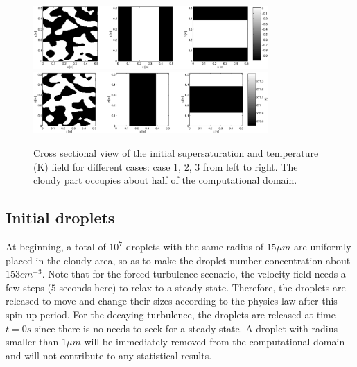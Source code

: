 \documentclass[draft,jgrga]{AGUTeX}
\begin{document}
\begin{article}
\begin{figure}\centering
\includegraphics[width=0.8\textwidth]{Figures/supersat_case123}\\
\includegraphics[width=0.8\textwidth]{Figures/temp_case123}
\caption{Cross sectional view of the initial supersaturation and temperature (K) field for different cases: case 1, 2, 3 from left to right. The cloudy part occupies about half of the computational domain.\label{fig:slice_case123}}
\end{figure}

\subsection{Initial droplets}

At beginning, a total of $10^{7}$ droplets with the same radius of $15\mu m$  are uniformly placed in the cloudy area, so as to make the droplet number concentration about $153{cm}^{-3}$. Note that for the forced turbulence scenario, the velocity field needs a few steps ($5$ seconds here) to relax to a steady state. Therefore, the droplets are released to move and change their sizes according to the physics law after this spin-up period. For the decaying turbulence, the droplets are released at time $t = 0s$ since there is no needs to seek for a steady state. A droplet with radius smaller than $1\mu m$ will be immediately removed from the computational domain and will not contribute to any statistical results. 


\end{article}
\end{document}

